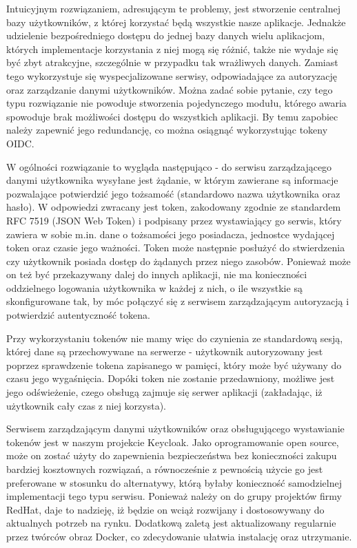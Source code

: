\documentclass[11pt,a4paper,twoside]{article}
\begin{document}
Intuicyjnym rozwiązaniem, adresującym te problemy, jest stworzenie centralnej bazy użytkowników, z której korzystać będą wszystkie nasze aplikacje. Jednakże udzielenie bezpośredniego dostępu do jednej bazy danych wielu aplikacjom, których implementacje korzystania z niej mogą się różnić, także nie wydaje się być zbyt atrakcyjne, szczególnie w przypadku tak wrażliwych danych. Zamiast tego wykorzystuje się wyspecjalizowane serwisy, odpowiadające za autoryzację oraz zarządzanie danymi użytkowników. Można zadać sobie pytanie, czy tego typu rozwiązanie nie powoduje stworzenia pojedynczego modułu, którego awaria spowoduje brak możliwości dostępu do wszystkich aplikacji. By temu zapobiec należy zapewnić jego redundancję, co można osiągnąć wykorzystując tokeny OIDC.

W ogólności rozwiązanie to wygląda następująco - do serwisu zarządzającego danymi użytkownika wysyłane jest żądanie, w którym zawierane są informacje pozwalające potwierdzić jego tożsamość (standardowo nazwa użytkownika oraz hasło). W odpowiedzi zwracany jest token, zakodowany zgodnie ze standardem RFC 7519 (JSON Web Token) i podpisany przez wystawiający go serwis, który zawiera w sobie m.in. dane o tożsamości jego posiadacza,  jednostce wydającej token oraz czasie jego ważności. Token może następnie posłużyć do stwierdzenia czy użytkownik posiada dostęp do żądanych przez niego zasobów. Ponieważ może on też być przekazywany dalej do innych aplikacji, nie ma konieczności oddzielnego logowania użytkownika w każdej z nich, o ile wszystkie są skonfigurowane tak, by móc połączyć się z serwisem zarządzającym autoryzacją i potwierdzić autentyczność tokena.

Przy wykorzystaniu tokenów nie mamy więc do czynienia ze standardową sesją, której dane są przechowywane na serwerze - użytkownik autoryzowany jest poprzez sprawdzenie tokena zapisanego w pamięci, który może być używany do czasu jego wygaśnięcia. Dopóki token nie zostanie przedawniony, możliwe jest jego odświeżenie, czego obsługą zajmuje się serwer aplikacji (zakładając, iż użytkownik cały czas z niej korzysta).

Serwisem zarządzającym danymi użytkowników oraz obsługującego wystawianie tokenów jest w naszym projekcie Keycloak. Jako oprogramowanie open source, może on zostać użyty do zapewnienia bezpieczeństwa bez konieczności zakupu bardziej kosztownych rozwiązań, a równocześnie z pewnością użycie go jest preferowane w stosunku do alternatywy, którą byłaby konieczność samodzielnej implementacji tego typu serwisu. Ponieważ należy on do grupy projektów firmy RedHat, daje to nadzieję, iż będzie on wciąż rozwijany i dostosowywany do aktualnych potrzeb na rynku. Dodatkową zaletą jest aktualizowany regularnie przez twórców obraz Docker, co zdecydowanie ułatwia instalację oraz utrzymanie.
\end{document}
